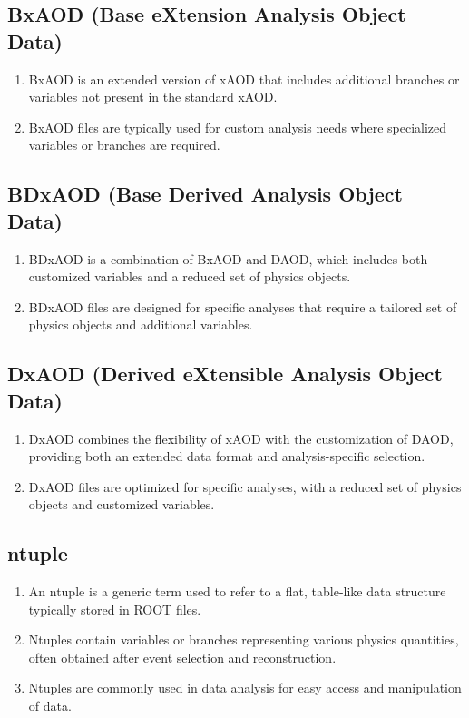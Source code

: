 \documentclass{ctexart}
\begin{document}
\subsection{BxAOD (Base eXtension Analysis Object Data)}
\begin{enumerate}
    \item BxAOD is an extended version of xAOD that includes additional branches or variables not present in the standard xAOD.
    \item BxAOD files are typically used for custom analysis needs where specialized variables or branches are required.
\end{enumerate}

\subsection{BDxAOD (Base Derived Analysis Object Data)}
\begin{enumerate}
    \item BDxAOD is a combination of BxAOD and DAOD, which includes both customized variables and a reduced set of physics objects.
    \item BDxAOD files are designed for specific analyses that require a tailored set of physics objects and additional variables.
\end{enumerate}

\subsection{DxAOD (Derived eXtensible Analysis Object Data)}
\begin{enumerate}
    \item DxAOD combines the flexibility of xAOD with the customization of DAOD, providing both an extended data format and analysis-specific selection.
    \item DxAOD files are optimized for specific analyses, with a reduced set of physics objects and customized variables.
\end{enumerate}

\subsection{ntuple}
\begin{enumerate}
    \item An ntuple is a generic term used to refer to a flat, table-like data structure typically stored in ROOT files.
    \item Ntuples contain variables or branches representing various physics quantities, often obtained after event selection and reconstruction.
    \item Ntuples are commonly used in data analysis for easy access and manipulation of data.
\end{enumerate}
\end{document}
